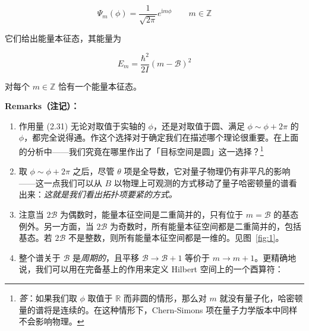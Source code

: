 \begin{equation}
  \Psi_m(\phi)=\frac{1}{\sqrt{2\pi}}e^{\mathrm{i}m\phi}
  \qquad m\in\mathbb{Z}
  \tag{2.11}
  \label{eq:2.11}
\end{equation}

它们给出能量本征态，其能量为

\begin{equation}
  E_m=\frac{\hbar^{2}}{2I}(m-\mathcal{B})^{2}
  \tag{2.12}
  \label{eq:2.12}
\end{equation}

对每个 $m\in\mathbb{Z}$ 恰有一个能量本征态。


\textbf{Remarks（注记）：}

\begin{enumerate}
  \item 作用量 (2.31) 无论对取值于实轴的 $\phi$，还是对取值于圆、满足 $\phi\sim\phi+2\pi$ 的 $\phi$，都完全说得通。作这个选择对于确定我们在描述哪个理论很重要。在上面的分析中——我们究竟在哪里作出了「目标空间是圆」这一选择？\footnote{\emph{答}：如果我们取 $\phi$ 取值于 $\mathbb{R}$ 而非圆的情形，那么对 $m$ 就没有量子化，哈密顿量的谱将是连续的。在这种情形下，Chern-Simons 项在量子力学版本中同样不会影响物理。}
  \item 取 $\phi\sim\phi+2\pi$ 之后，尽管 $\theta$ 项是全导数，它对量子物理仍有非平凡的影响——这一点我们可以从 $B$ 以物理上可观测的方式移动了量子哈密顿量的谱看出来：\emph{这就是我们看出拓扑项要紧的方式。}
  \item 注意当 $2\mathcal{B}$ 为偶数时，能量本征空间是二重简并的，只有位于 $m=\mathcal{B}$ 的基态例外。另一方面，当 $2\mathcal{B}$ 为奇数时，所有能量本征空间都是二重简并的，包括基态。若 $2\mathcal{B}$ 不是整数，则所有能量本征空间都是一维的。见图~\ref{fig:1}。
  \item 整个谱关于 $\mathcal{B}$ 是\emph{周期的}，且平移 $\mathcal{B}\to\mathcal{B}+1$ 等价于 $m\to m+1$。更精确地说，我们可以用在完备基上的作用来定义 Hilbert 空间上的一个酉算符：
\end{enumerate}

